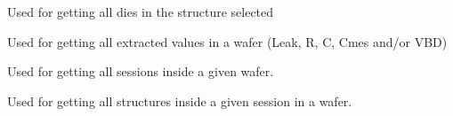 \documentclass[letterpaper,10pt,english]{sphinxmanual}
\begin{document}

\begin{fulllineitems}
\label{\detokenize{app:app.get_matrices}}
\pysigstartsignatures
{}
\pysigstopsignatures
\sphinxAtStartPar
Used for getting all dies in the structure selected

\end{fulllineitems}


\begin{fulllineitems}
\label{\detokenize{app:app.get_normal_values}}
\pysigstartsignatures
{}
\pysigstopsignatures
\sphinxAtStartPar
Used for getting all extracted values in a wafer (Leak, R, C, Cmes and/or VBD)

\end{fulllineitems}


\begin{fulllineitems}
\label{\detokenize{app:app.get_sessions_server}}
\pysigstartsignatures
{}
\pysigstopsignatures
\sphinxAtStartPar
Used for getting all sessions inside a given wafer.

\end{fulllineitems}


\begin{fulllineitems}
\label{\detokenize{app:app.get_structures_json}}
\pysigstartsignatures
{}
\pysigstopsignatures
\sphinxAtStartPar
Used for getting all structures inside a given session in a wafer.

\end{fulllineitems}
\end{document}
